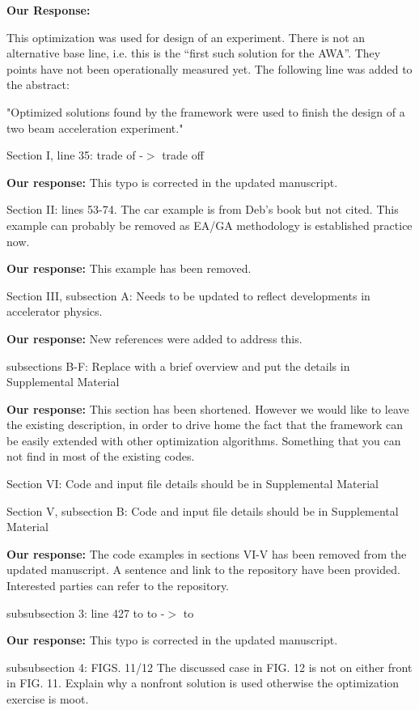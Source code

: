 \documentclass{article}
\begin{document}
{\bf Our Response:} {\color{blue} This optimization was used for design of 
an experiment. There is not an alternative base line, i.e. this is the 
``first such solution for the AWA''. They points have not been operationally measured yet.
The following line was added to the abstract: 

"Optimized solutions found by the framework were used to finish the design 
of a two beam acceleration experiment."
}

Section I, line 35: trade of -$>$ trade off

{\bf Our response:} {\color{blue} This typo is corrected in the updated manuscript.}

Section II:
lines 53-74. The car example is from Deb’s book but not cited. This
example can probably be removed as EA/GA methodology is established
practice now.

{\bf Our response:} {\color{blue} This example has been removed.}

Section III, subsection A:
Needs to be updated to reflect developments in accelerator physics.

{\bf Our response:} {\color{blue} New references were added to address this.}

subsections B-F:
Replace with a brief overview and put the details in Supplemental
Material

{\bf Our response: } {\color{blue} This section has been shortened. However we would like to 
leave the existing description, in order to drive home the fact that the framework can be 
easily extended with other optimization algorithms. Something that you can not find in most of the 
existing codes.}

Section VI: 
Code and input file details should be in Supplemental Material

Section V, subsection B:
Code and input file details should be in Supplemental Material

{\bf Our response:} {\color{blue} The code examples in sections VI-V has been removed from the updated manuscript. 
	A sentence and link to the repository have been provided. Interested parties can refer to the repository.}

subsubsection 3:
line 427 to to -$>$ to

{\bf Our response:} {\color{blue} This typo is corrected in the updated manuscript.}

subsubsection 4:
FIGS. 11/12 The discussed case in FIG. 12 is not on either front in
FIG. 11. Explain why a nonfront solution is used otherwise the
optimization exercise is moot.
\end{document}
